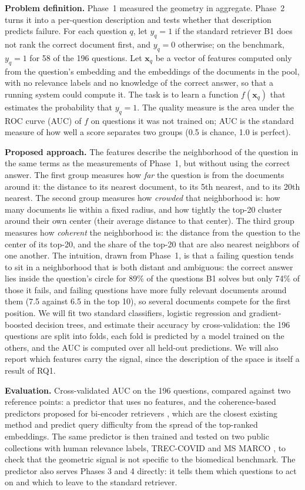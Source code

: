 \documentclass[12pt,a4paper]{article}
\begin{document}
\textbf{Problem definition.} Phase~1 measured the geometry in aggregate. Phase~2 turns it into a per-question description and tests whether that description predicts failure. For each question $q$, let $y_q = 1$ if the standard retriever B1 does not rank the correct document first, and $y_q = 0$ otherwise; on the benchmark, $y_q=1$ for 58 of the 196 questions. Let $\mathbf{x}_q$ be a vector of features computed only from the question's embedding and the embeddings of the documents in the pool, with no relevance labels and no knowledge of the correct answer, so that a running system could compute it. The task is to learn a function $f(\mathbf{x}_q)$ that estimates the probability that $y_q=1$. The quality measure is the area under the ROC curve (AUC) of $f$ on questions it was not trained on; AUC is the standard measure of how well a score separates two groups (0.5 is chance, 1.0 is perfect).

\textbf{Proposed approach.} The features describe the neighborhood of the question in the same terms as the measurements of Phase~1, but without using the correct answer. The first group measures how \emph{far} the question is from the documents around it: the distance to its nearest document, to its 5th nearest, and to its 20th nearest. The second group measures how \emph{crowded} that neighborhood is: how many documents lie within a fixed radius, and how tightly the top-20 cluster around their own center (their average distance to that center). The third group measures how \emph{coherent} the neighborhood is: the distance from the question to the center of its top-20, and the share of the top-20 that are also nearest neighbors of one another. The intuition, drawn from Phase~1, is that a failing question tends to sit in a neighborhood that is both distant and ambiguous: the correct answer lies inside the question's circle for 89\% of the questions B1 solves but only 74\% of those it fails, and failing questions have more fully relevant documents around them (7.5 against 6.5 in the top 10), so several documents compete for the first position. We will fit two standard classifiers, logistic regression and gradient-boosted decision trees, and estimate their accuracy by cross-validation: the 196 questions are split into folds, each fold is predicted by a model trained on the others, and the AUC is computed over all held-out predictions. We will also report which features carry the signal, since the description of the space is itself a result of RQ1.

\textbf{Evaluation.} Cross-validated AUC on the 196 questions, compared against two reference points: a predictor that uses no features, and the coherence-based predictors proposed for bi-encoder retrievers \citep{vlachou2023coherence}, which are the closest existing method and predict query difficulty from the spread of the top-ranked embeddings. The same predictor is then trained and tested on two public collections with human relevance labels, TREC-COVID \citep{roberts2020treccovid} and MS MARCO \citep{nguyen2016msmarco}, to check that the geometric signal is not specific to the biomedical benchmark. The predictor also serves Phases 3 and 4 directly: it tells them which questions to act on and which to leave to the standard retriever.
\end{document}
